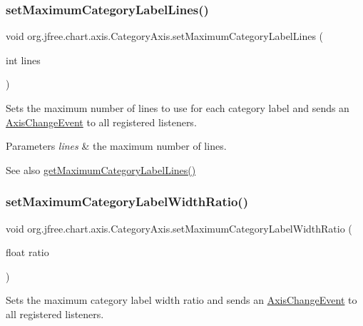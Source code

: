 \subsubsection{\texorpdfstring{set\+Maximum\+Category\+Label\+Lines()}{setMaximumCategoryLabelLines()}}
{\footnotesize\ttfamily void org.\+jfree.\+chart.\+axis.\+Category\+Axis.\+set\+Maximum\+Category\+Label\+Lines (\begin{DoxyParamCaption}\item[{int}]{lines }\end{DoxyParamCaption})}

Sets the maximum number of lines to use for each category label and sends an \mbox{\hyperlink{}{Axis\+Change\+Event}} to all registered listeners.


\begin{DoxyParams}{Parameters}
{\em lines} & the maximum number of lines.\\
\hline
\end{DoxyParams}
\begin{DoxySeeAlso}{See also}
\mbox{\hyperlink{classorg_1_1jfree_1_1chart_1_1axis_1_1_category_axis_a9f982c4d5747dad3f3c1580ffaa90104}{get\+Maximum\+Category\+Label\+Lines()}} 
\end{DoxySeeAlso}
\mbox{\label{classorg_1_1jfree_1_1chart_1_1axis_1_1_category_axis_a24e3faae5e1ef3bd29147892dda79c27}} 
\subsubsection{\texorpdfstring{set\+Maximum\+Category\+Label\+Width\+Ratio()}{setMaximumCategoryLabelWidthRatio()}}
{\footnotesize\ttfamily void org.\+jfree.\+chart.\+axis.\+Category\+Axis.\+set\+Maximum\+Category\+Label\+Width\+Ratio (\begin{DoxyParamCaption}\item[{float}]{ratio }\end{DoxyParamCaption})}

Sets the maximum category label width ratio and sends an \mbox{\hyperlink{}{Axis\+Change\+Event}} to all registered listeners.


